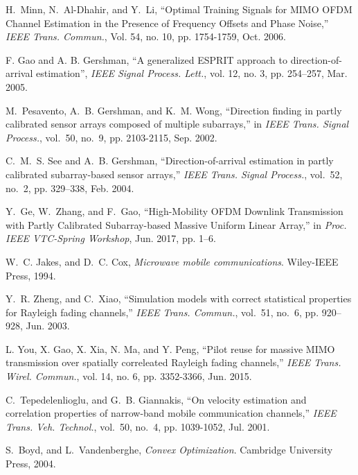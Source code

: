 \documentclass[12pt, draftclsnofoot, onecolumn]{IEEEtran}
\begin{document}
\begin{thebibliography}{99}
H.~Minn, N.~Al-Dhahir, and Y.~Li, ``Optimal Training Signals for MIMO OFDM Channel Estimation in the Presence of Frequency Offsets and Phase Noise,'' \emph{IEEE Trans. Commun.}, Vol. 54, no. 10, pp. 1754-1759, Oct. 2006.

F. Gao and A. B. Gershman, ``A generalized ESPRIT approach to direction-of-arrival estimation'', \emph{IEEE Signal Process. Lett.}, vol. 12, no. 3, pp. 254--257, Mar. 2005.

M.~Pesavento, A.~B. Gershman, and K.~M. Wong, ``Direction finding in partly calibrated sensor arrays composed of multiple subarrays,'' in \emph{IEEE
  Trans. Signal Process.}, vol.~50, no.~9, pp. 2103-2115, Sep. 2002.

C.~M.~S. See and A.~B. Gershman, ``Direction-of-arrival estimation in partly calibrated subarray-based sensor arrays,'' \emph{IEEE Trans. Signal Process.}, vol.~52, no.~2, pp. 329--338, Feb. 2004.

Y.~Ge, W.~Zhang, and F.~Gao, ``High-Mobility OFDM Downlink Transmission with
Partly Calibrated Subarray-based Massive Uniform Linear Array,'' in \emph{Proc. IEEE VTC-Spring Workshop}, Jun. 2017, pp. 1--6.

W.~C. Jakes, and D.~C. Cox, \emph{Microwave mobile communications}. Wiley-IEEE Press, 1994.

Y.~R. Zheng, and C.~Xiao, ``Simulation models with correct statistical
properties for {R}ayleigh fading channels,'' \emph{IEEE Trans. Commun.}, vol.~51, no.~6, pp. 920--928, Jun. 2003.

L. You, X. Gao, X. Xia, N. Ma, and Y. Peng, ``Pilot reuse for massive MIMO transmission over spatially correleated Rayleigh fading channels,'' \emph{IEEE Trans. Wirel. Commun.}, vol. 14, no. 6, pp. 3352-3366, Jun. 2015.

C.~Tepedelenlioglu, and G.~B. Giannakis, ``On velocity estimation and correlation properties of narrow-band mobile communication channels,'' \emph{IEEE Trans. Veh. Technol.}, vol.~50, no.~4, pp. 1039-1052, Jul. 2001.
%

S.~Boyd, and L.~Vandenberghe, \emph{Convex Optimization}. Cambridge University Press, 2004.


\end{thebibliography}
\end{document}
